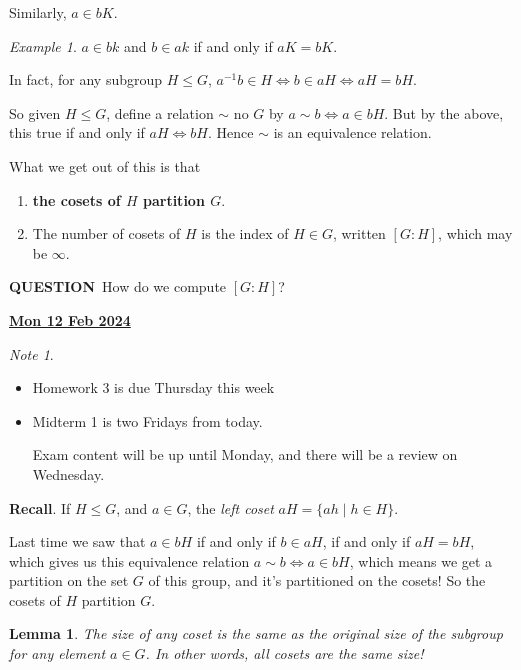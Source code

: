 \documentclass[12pt]{article}
\renewcommand{\date}[1]{\underline{\bf #1}}
\def\QUESTION{\color{red}\textbf{QUESTION}\color{black}\,}
\newtheorem{lemma}[theorem]{Lemma} %
\theoremstyle{remark}
\theoremstyle{remark}
\theoremstyle{remark}
\newtheorem{example}{Example}
\theoremstyle{remark}
\theoremstyle{remark}
\newtheorem*{note}{Note}
\begin{document}
Similarly, $a \in bK$.

\begin{example}
  $a \in bk$ and $b \in ak$ if and only if $aK = bK$.
\end{example}

In fact, for any subgroup $H \le G$, $a^{-1}b \in H \Leftrightarrow b \in aH
\Leftrightarrow aH = bH$.

So given $H \le G$, define a relation $\sim$ no $G$ by $a \sim b \Leftrightarrow
a \in bH$. But by the above, this true if and only if $aH \Leftrightarrow bH$.
Hence $\sim$ is an equivalence relation.

What we get out of this is that

\begin{enumerate}
  \item {\bf the cosets of $H$ partition $G$}.
  \item The number of cosets of $H$ is the index of $H \in G$, written $[G : H]$, which may be $\infty$.
\end{enumerate}

\QUESTION {} How do we compute $[G : H]$?

\date{Mon 12 Feb 2024}

\begin{note}
  \begin{itemize}
    \item Homework 3 is due Thursday this week
    \item Midterm 1 is two Fridays from today.

      Exam content will be up until Monday, and there will be a review on
      Wednesday.
  \end{itemize}
\end{note}

{\bf Recall}. If $H \le G$, and $a \in G$, the {\it left coset} $aH = \{ah \mid
h \in H \}$.

Last time we saw that $a \in bH$ if and only if $b \in aH$, if and only if $aH =
bH$, which gives us this equivalence relation $a \sim b \Leftrightarrow a \in
bH$, which means we get a partition on the set $G$ of this group, and it's
partitioned on the cosets! So the cosets of $H$ partition $G$.

\begin{lemma}
  The size of any coset is the same as the original size of the
  subgroup for any element $a \in G$. In other words, all cosets are the same
  size!
\end{lemma}
\end{document}

